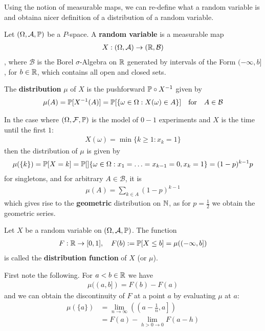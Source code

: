 Using the notion of measurable maps, we can re-define what a random variable is and obtaina nicer definition of a distribution of a random variable.
\begin{dfn}[]
  Let $(\Omega,\mathcal{A},\mathbb{P})$ be a $P$-space. A \textbf{random variable} is a measurable map
  \begin{align*}
    X: (\Omega,\mathcal{A}) \to (\mathbb{R},\mathcal{B})
  \end{align*}
  , where $\mathcal{B}$ is the Borel $\sigma$-Algebra on $\mathbb{R}$ generated by intervals of the Form $(- \infty, b]$, for $b \in \mathbb{R}$, which contains all open and closed sets.

  The \textbf{distribution} $\mu$ of $X$ is the pushforward $\mathbb{P} \circ X^{-1}$ given by
  \begin{align*}
    \mu(A) = \mathbb{P}[X^{-1}(A)] = \mathbb{P}[\{\omega \in \Omega: X(\omega) \in A\}] \quad \text{for} \quad A \in \mathcal{B}
  \end{align*}
\end{dfn}

\begin{ex}[]
  In the case where $(\Omega,\mathcal{F},\mathbb{P})$ is the model of $0-1$ experiments and $X$ is the time until the first $1$:
  \begin{align*}
    X(\omega) = \min \{k \geq 1: x_k = 1\}
  \end{align*}
  then the distribution of $\mu$ is given by
  \begin{align*}
    \mu(\{k\}) = \mathbb{P}[X = k] = \mathbb{P}[]\{\omega \in \Omega: x_1 = \ldots = x_{k-1} = 0, x_k = 1\} = (1-p)^{k-1}p
  \end{align*}
  for singletons, and for arbitrary $A \in \mathcal{B}$, it is
  \begin{align*}
    \mu(A) = \sum_{k \in A}(1-p)^{k-1}
  \end{align*}
  which gives rise to the \textbf{geometric} distribution on $\mathbb{N}$, as for $p = \tfrac{1}{2}$ we obtain the geometric series.
\end{ex}

\begin{dfn}[]
  Let $X$ be a random variable on $(\Omega,\mathcal{A},\mathbb{P})$. 
  The function 
  \begin{align*}
    F: \mathbb{R} \to [0,1], \quad F(b) := \mathbb{P}[X \leq b] = \mu((-\infty,b])
  \end{align*}
  is called the \textbf{distribution function} of $X$ (or $\mu$).
\end{dfn}

\begin{rem}[]
First note the following. For $a < b \in \mathbb{R}$ we have
\begin{align*}
  \mu((a,b]) = F(b) - F(a)
\end{align*}
and we can obtain the discontinuity of $F$ at a point $a$ by evaluating $\mu$ at $a$:
\begin{align*}
  \mu(\{a\}) 
  &= \lim_{n \to \infty} \left(
    \left(
      a - \frac{1}{n}, a
    \right]
  \right)
  \\
  &= F(a) - \lim_{h > 0 \to 0} F(a - h)
\end{align*}
\end{rem}

